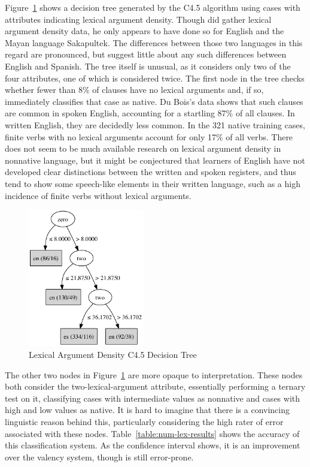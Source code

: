 \documentclass[main.tex]{subfiles}
\begin{document}
Figure~\ref{fig:c4.5-num-lex} shows a decision tree generated by the C4.5 algorithm using cases with attributes indicating lexical argument density. Though \citet{dubois:2003} did gather lexical argument density data, he only appears to have done so for English and the Mayan language Sakapultek. The differences between those two languages in this regard are pronounced, but suggest little about any such differences between English and Spanish. The tree itself is unusual, as it considers only two of the four attributes, one of which is considered twice. The first node in the tree checks whether fewer than 8\% of clauses have no lexical arguments and, if so, immediately classifies that case as native. Du Bois's data shows that such clauses are common in spoken English, accounting for a startling 87\% of all clauses. In written English, they are decidedly less common. In the 321 native training cases, finite verbs with no lexical arguments account for only 17\% of all verbs. There does not seem to be much available research on lexical argument density in nonnative language, but it might be conjectured that learners of English have not developed clear distinctions between the written and spoken registers, and thus tend to show some speech-like elements in their written language, such as a high incidence of finite verbs without lexical arguments. 
\begin{figure}[htbp]
\centering
\includegraphics[width=2in]{c45-num-lex.pdf}
\caption{Lexical Argument Density C4.5 Decision Tree}
\label{fig:c4.5-num-lex}
\end{figure}

The other two nodes in Figure~\ref{fig:c4.5-num-lex} are more opaque to interpretation. These nodes both consider the two-lexical-argument attribute, essentially performing a ternary test on it, classifying cases with intermediate values as nonnative and cases with high and low values as native. It is hard to imagine that there is a convincing linguistic reason behind this, particularly considering the high rater of error associated with these nodes. Table~\ref{table:num-lex-results} shows the accuracy of this classification system. As the confidence interval shows, it is an improvement over the valency system, though is still error-prone.
\end{document}
